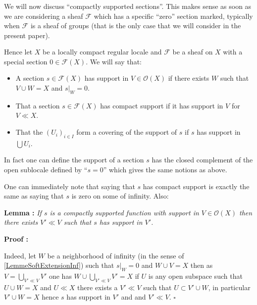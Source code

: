\documentclass[a4paper]{article}
\newcommand{\Ocal}{\mathcal{O}}
\newcommand{\Fcal}{\mathcal{F}}
\newcommand{\block}[1]
{

\par \subsubsection{} #1

\bigskip}
\newcommand{\Lem}[1]
	{

	\bigskip
	
	\textbf{Lemma : }{\itshape #1}
		
	\bigskip
	
	}
\newcommand{\Dem}[1]{
	
	\smallskip
	
	\textbf{Proof : } \par
	 {#1} $\square$
	 
	 \bigskip
}
\begin{document}
\block{We will now discuss ``compactly supported sections''. This makes sense as soon as we are considering a sheaf $\Fcal$ which has a specific ``zero'' section marked, typically when $\Fcal$ is a sheaf of groups (that is the only case that we will consider in the present paper).

Hence let $X$ be a locally compact regular locale and $\Fcal$ be a sheaf on $X$ with a special section $0 \in \Fcal(X)$. We will say that:


\begin{itemize}

\item A section $s \in \Fcal(X)$ has support in $V \in \Ocal(X)$ if there exists $W$ such that $V \cup W =X$ and $s|_W = 0$.

\item That a section $s \in \Fcal(X)$ has compact support if it has support in $V$ for $V \ll X$.

\item That the $(U_i)_{i \in I}$ form a covering of the support of $s$ if $s$ has support in $\bigcup U_i$.

\end{itemize}

In fact one can define the support of a section $s$ has the closed complement of the open sublocale defined by ``$s=0$'' which gives the same notions as above.

One can immediately note that saying that $s$ has compact support is exactly the same as saying that $s$ is zero on some  of infinity. Also:

\Lem{ If $s$ is a compactly supported function with support in $V \in \Ocal(X)$ then there exists $V' \ll V$ such that $s$ has support in $V'$.}

\Dem{Indeed, let $W$ be a neighborhood of infinity (in the sense of \ref{LemmeSoftExtensionInf}) such that $s|_W=0$ and $W \cup V=X$ then as $V = \bigcup_{V' \ll V}  V' $ one has $W \cup \bigcup_{V' \ll V} V' =X$ if $U$ is any open subspace such that $U \cup W = X$ and $U \ll X$ there exists a $V' \ll V$ such that $U \subset V' \cup W$, in particular $V' \cup W = X$ hence $s$ has support in $V'$ and and $V' \ll V$.}

}
\end{document}
